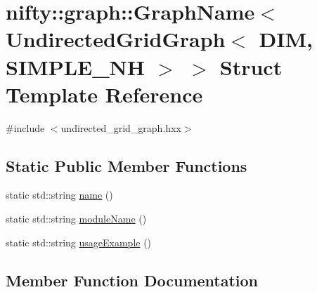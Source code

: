\hypertarget{structnifty_1_1graph_1_1GraphName_3_01UndirectedGridGraph_3_01DIM_00_01SIMPLE__NH_01_4_01_4}{}\section{nifty\+:\+:graph\+:\+:Graph\+Name$<$ Undirected\+Grid\+Graph$<$ D\+I\+M, S\+I\+M\+P\+L\+E\+\_\+\+N\+H $>$ $>$ Struct Template Reference}
\label{structnifty_1_1graph_1_1GraphName_3_01UndirectedGridGraph_3_01DIM_00_01SIMPLE__NH_01_4_01_4}


{\ttfamily \#include $<$undirected\+\_\+grid\+\_\+graph.\+hxx$>$}

\subsection*{Static Public Member Functions}
\begin{DoxyCompactItemize}
\item 
static std\+::string \hyperlink{structnifty_1_1graph_1_1GraphName_3_01UndirectedGridGraph_3_01DIM_00_01SIMPLE__NH_01_4_01_4_aa0e1bec8e4b38ab328fd2a3ff5a30328}{name} ()
\item 
static std\+::string \hyperlink{structnifty_1_1graph_1_1GraphName_3_01UndirectedGridGraph_3_01DIM_00_01SIMPLE__NH_01_4_01_4_a7f1fc38bc8099e6d362bba8385e09771}{module\+Name} ()
\item 
static std\+::string \hyperlink{structnifty_1_1graph_1_1GraphName_3_01UndirectedGridGraph_3_01DIM_00_01SIMPLE__NH_01_4_01_4_a2a5e5d8519a4690e6b6598e0d09aa281}{usage\+Example} ()
\end{DoxyCompactItemize}


\subsection{Member Function Documentation}
\hypertarget{structnifty_1_1graph_1_1GraphName_3_01UndirectedGridGraph_3_01DIM_00_01SIMPLE__NH_01_4_01_4_a7f1fc38bc8099e6d362bba8385e09771}{}
